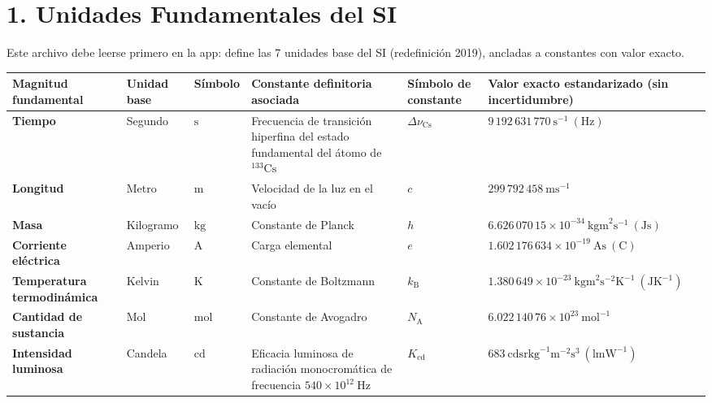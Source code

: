 \documentclass[11pt,a4paper]{article}
\begin{document}
\section*{1. Unidades Fundamentales del SI}

Este archivo debe leerse primero en la app: define las 7 unidades base del SI (redefinición 2019), ancladas a constantes con valor exacto.

\scriptsize
\begin{tabularx}{\linewidth}{>{\raggedright\arraybackslash}X>{\raggedright\arraybackslash}X>{\raggedright\arraybackslash}X>{\raggedright\arraybackslash}X>{\raggedright\arraybackslash}X>{\raggedright\arraybackslash}X}
\hline
Magnitud fundamental & Unidad base & Símbolo & Constante definitoria asociada & Símbolo de constante & Valor exacto estandarizado (sin incertidumbre) \\
\hline
\textbf{Tiempo} & Segundo & $\mathrm{s}$ & Frecuencia de transición hiperfina del estado fundamental del átomo de $^{133}\mathrm{Cs}$ & $\Delta\nu_{\mathrm{Cs}}$ & $9\,192\,631\,770\ \mathrm{s}^{-1}\ (\mathrm{Hz})$ \\
\hline
\textbf{Longitud} & Metro & $\mathrm{m}$ & Velocidad de la luz en el vacío & $c$ & $299\,792\,458\ \mathrm{m s}^{-1}$ \\
\hline
\textbf{Masa} & Kilogramo & $\mathrm{kg}$ & Constante de Planck & $h$ & $6.626\,070\,15 \times 10^{-34}\ \mathrm{kg m}^2\mathrm{ s}^{-1}\ (\mathrm{J s})$ \\
\hline
\textbf{Corriente eléctrica} & Amperio & $\mathrm{A}$ & Carga elemental & $e$ & $1.602\,176\,634 \times 10^{-19}\ \mathrm{A s}\ (\mathrm{C})$ \\
\hline
\textbf{Temperatura termodinámica} & Kelvin & $\mathrm{K}$ & Constante de Boltzmann & $k_{\mathrm{B}}$ & $1.380\,649 \times 10^{-23}\ \mathrm{kg m}^2\mathrm{ s}^{-2}\mathrm{ K}^{-1}\ (\mathrm{J K}^{-1})$ \\
\hline
\textbf{Cantidad de sustancia} & Mol & $\mathrm{mol}$ & Constante de Avogadro & $N_{\mathrm{A}}$ & $6.022\,140\,76 \times 10^{23}\ \mathrm{mol}^{-1}$ \\
\hline
\textbf{Intensidad luminosa} & Candela & $\mathrm{cd}$ & Eficacia luminosa de radiación monocromática de frecuencia $540 \times 10^{12}\ \mathrm{Hz}$ & $K_{\mathrm{cd}}$ & $683\ \mathrm{cd sr kg}^{-1}\mathrm{ m}^{-2}\mathrm{ s}^3\ (\mathrm{lm W}^{-1})$ \\
\hline
\end{tabularx}
\normalsize
\end{document}
